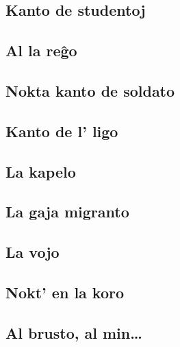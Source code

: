 \documentclass[a5paper,11pt,openany,twoside,leqno]{book}
\begin{document}
\subsection{Kanto de studentoj}
\label{studentoj}


\newpage %

\subsection{Al la re\^go}
\label{regxo}


\subsection{Nokta kanto de soldato}
\label{soldato}


\subsection{Kanto de l' ligo}
\label{ligo}


\subsection{La kapelo}
\label{kapelo}


\newpage %

\subsection{La gaja migranto}
\label{migranto}


\subsection{La vojo}
\label{lavojo2}


\newpage %


\subsection{Nokt' en la koro}
\label{noktenlakoro}


\subsection{Al brusto, al min\dots}
\label{albrusto}

\end{document}
